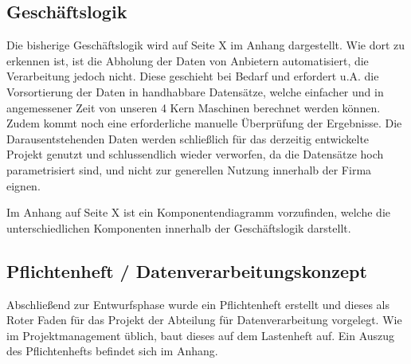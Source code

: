 \subsection{Geschäftslogik}
Die bisherige Geschäftslogik wird auf Seite X im Anhang dargestellt. Wie dort zu erkennen ist,
ist die Abholung der Daten von Anbietern automatisiert, die Verarbeitung jedoch nicht.
Diese geschieht bei Bedarf und erfordert u.A. die Vorsortierung der Daten in handhabbare
Datensätze, welche einfacher und in angemessener Zeit von unseren 4 Kern Maschinen
berechnet werden können. Zudem kommt noch eine erforderliche manuelle Überprüfung
der Ergebnisse. Die Darausentstehenden Daten werden schließlich für das derzeitig entwickelte Projekt
genutzt und schlussendlich wieder verworfen, da die Datensätze hoch parametrisiert sind,
und nicht zur generellen Nutzung innerhalb der Firma eignen.\par

Im Anhang auf Seite X ist ein Komponentendiagramm vorzufinden, welche die
unterschiedlichen Komponenten innerhalb der Geschäftslogik darstellt.

\subsection{Pflichtenheft / Datenverarbeitungskonzept}
Abschließend zur Entwurfsphase wurde ein Pflichtenheft erstellt und dieses als
Roter Faden für das Projekt der Abteilung für Datenverarbeitung vorgelegt. Wie im
Projektmanagement üblich, baut dieses auf dem Lastenheft auf.
Ein Auszug des Pflichtenhefts befindet sich im Anhang.
